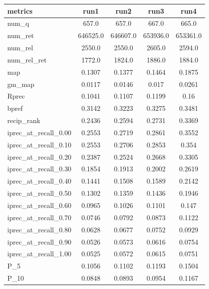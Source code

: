 \begin{center}
    \begin{tabular}{ |l|c|c|c|c| } 
        \hline
        metrics & run1 & run2 & run3 & run4 \\ \hline
        num\_q & 657.0 & 657.0 & 667.0 & 665.0 \\ \hline
        num\_ret & 646525.0 & 646607.0 & 653936.0 & 653361.0 \\ \hline
        num\_rel & 2550.0 & 2550.0 & 2605.0 & 2594.0 \\ \hline
        num\_rel\_ret & 1772.0 & 1824.0 & 1886.0 & 1884.0 \\ \hline
        map & 0.1307 & 0.1377 & 0.1464 & 0.1875 \\ \hline
        gm\_map & 0.0117 & 0.0146 & 0.017 & 0.0261 \\ \hline
        Rprec & 0.1041 & 0.1107 & 0.1199 & 0.16 \\ \hline
        bpref & 0.3142 & 0.3223 & 0.3275 & 0.3481 \\ \hline
        recip\_rank & 0.2436 & 0.2594 & 0.2731 & 0.3369 \\ \hline
        iprec\_at\_recall\_0.00 & 0.2553 & 0.2719 & 0.2861 & 0.3552 \\ \hline
        iprec\_at\_recall\_0.10 & 0.2553 & 0.2706 & 0.2853 & 0.354 \\ \hline
        iprec\_at\_recall\_0.20 & 0.2387 & 0.2524 & 0.2668 & 0.3305 \\ \hline
        iprec\_at\_recall\_0.30 & 0.1854 & 0.1913 & 0.2002 & 0.2619 \\ \hline
        iprec\_at\_recall\_0.40 & 0.1441 & 0.1508 & 0.1589 & 0.2142 \\ \hline
        iprec\_at\_recall\_0.50 & 0.1302 & 0.1359 & 0.1436 & 0.1946 \\ \hline
        iprec\_at\_recall\_0.60 & 0.0965 & 0.1026 & 0.1101 & 0.147 \\ \hline
        iprec\_at\_recall\_0.70 & 0.0746 & 0.0792 & 0.0873 & 0.1122 \\ \hline
        iprec\_at\_recall\_0.80 & 0.0628 & 0.0677 & 0.0752 & 0.0929 \\ \hline
        iprec\_at\_recall\_0.90 & 0.0526 & 0.0573 & 0.0616 & 0.0754 \\ \hline
        iprec\_at\_recall\_1.00 & 0.0525 & 0.0572 & 0.0615 & 0.0751 \\ \hline
        P\_5 & 0.1056 & 0.1102 & 0.1193 & 0.1504 \\ \hline
        P\_10 & 0.0848 & 0.0893 & 0.0954 & 0.1167 \\ \hline

\end{tabular}
\end{center}
